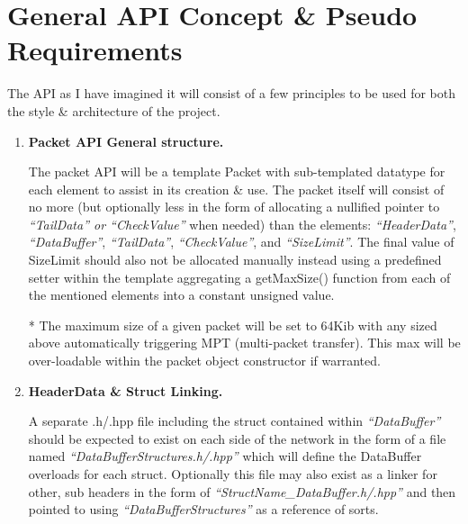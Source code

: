 \documentclass{article}
\begin{document}
\section{General API Concept \& Pseudo Requirements}
The API as I have imagined it will consist of a few principles to be used for both the style \& architecture of the project.
\begin{enumerate}
    \item \textbf{Packet API General structure.}

    The packet API will be a template Packet with sub-templated datatype for each element to assist in its creation \& use. The packet itself will consist of no more (but optionally less in the form of allocating a nullified pointer to \textit{``TailData'' or ``CheckValue''} when needed) than the elements: \textit{``HeaderData''}, \textit{``DataBuffer''}, \textit{``TailData''}, \textit{``CheckValue''}, and \textit{``SizeLimit''}. The final value of SizeLimit should also not be allocated manually instead using a predefined setter within the template aggregating a getMaxSize() function from each of the mentioned elements into a constant unsigned value.
    
    * The maximum size of a given packet will be set to 64Kib with any sized above automatically triggering MPT (multi-packet transfer). This max will be over-loadable within the packet object constructor if warranted.

    \item \textbf{HeaderData \& Struct Linking.}

    A separate .h/.hpp file including the struct contained within \textit{``DataBuffer''} should be expected to exist on each side of the network in the form of a file named \textit{``DataBufferStructures.h/.hpp''} which will define the DataBuffer overloads for each struct. Optionally this file may also exist as a linker for other, sub headers in the form of \textit{``StructName\_DataBuffer.h/.hpp''} and then pointed to using \textit{``DataBufferStructures''} as a reference of sorts.


\end{enumerate}
\end{document}
